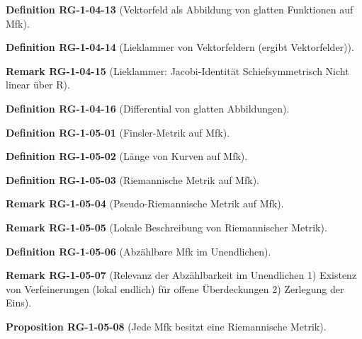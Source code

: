 \documentclass[10pt, letterpaper]{article}
\newcommand{\CustomHeading}[3]{%
  \par\medskip\noindent%
  \textbf{#1 #2} \textnormal{(#3)}.\enskip%
}
\newenvironment{DEF}[2]{\CustomHeading{Definition}{#1}{#2}}{}
\newenvironment{PROP}[2]{\CustomHeading{Proposition}{#1}{#2}}{}
\newenvironment{REM}[2]{\CustomHeading{Remark}{#1}{#2}}{}
\begin{document}
\begin{DEF}{RG-1-04-13}{Vektorfeld als Abbildung von glatten Funktionen auf Mfk}
\end{DEF}

\begin{DEF}{RG-1-04-14}{Lieklammer von Vektorfeldern (ergibt Vektorfelder)}
\end{DEF}

\begin{REM}{RG-1-04-15}{Lieklammer:
Jacobi-Identität
Schiefsymmetrisch
Nicht linear über R}
\end{REM}

\begin{DEF}{RG-1-04-16}{Differential von glatten Abbildungen}
\end{DEF}

\begin{DEF}{RG-1-05-01}{Finsler-Metrik auf Mfk}
\end{DEF}

\begin{DEF}{RG-1-05-02}{Länge von Kurven auf Mfk}
\end{DEF}

\begin{DEF}{RG-1-05-03}{Riemannische Metrik auf Mfk}
\end{DEF}

\begin{REM}{RG-1-05-04}{Pseudo-Riemannische Metrik auf Mfk}
\end{REM}

\begin{REM}{RG-1-05-05}{Lokale Beschreibung von Riemannischer Metrik}
\end{REM}

\begin{DEF}{RG-1-05-06}{Abzählbare Mfk im Unendlichen}
\end{DEF}

\begin{REM}{RG-1-05-07}{Relevanz der Abzählbarkeit im Unendlichen
1) Existenz von Verfeinerungen (lokal endlich) für offene Überdeckungen
2) Zerlegung der Eins}
\end{REM}

\begin{PROP}{RG-1-05-08}{Jede Mfk besitzt eine Riemannische Metrik}
\end{PROP}
\end{document}
